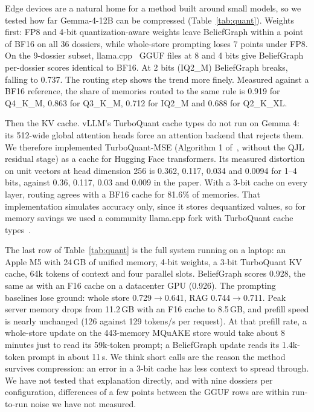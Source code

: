 \documentclass[conference]{IEEEtran}
\begin{document}
Edge devices are a natural home for a method built around small models, so we tested how far Gemma-4-12B can be compressed (Table~\ref{tab:quant}). Weights first: FP8 and 4-bit quantization-aware weights leave BeliefGraph within a point of BF16 on all 36 dossiers, while whole-store prompting loses 7 points under FP8. On the 9-dossier subset, llama.cpp~\cite{llamacpp} GGUF files at 8 and 4 bits give BeliefGraph per-dossier scores identical to BF16. At 2 bits (IQ2\_M) BeliefGraph breaks, falling to 0.737. The routing step shows the trend more finely. Measured against a BF16 reference, the share of memories routed to the same rule is 0.919 for Q4\_K\_M, 0.863 for Q3\_K\_M, 0.712 for IQ2\_M and 0.688 for Q2\_K\_XL.

Then the KV cache. vLLM's TurboQuant cache types do not run on Gemma 4: its 512-wide global attention heads force an attention backend that rejects them. We therefore implemented TurboQuant-MSE (Algorithm 1 of~\cite{zandieh2026turboquant}, without the QJL residual stage) as a cache for Hugging Face transformers. Its measured distortion on unit vectors at head dimension 256 is 0.362, 0.117, 0.034 and 0.0094 for 1--4 bits, against 0.36, 0.117, 0.03 and 0.009 in the paper. With a 3-bit cache on every layer, routing agrees with a BF16 cache for 81.6\% of memories. That implementation simulates accuracy only, since it stores dequantized values, so for memory savings we used a community llama.cpp fork with TurboQuant cache types~\cite{tqfork}.

The last row of Table~\ref{tab:quant} is the full system running on a laptop: an Apple M5 with 24\,GB of unified memory, 4-bit weights, a 3-bit TurboQuant KV cache, 64k tokens of context and four parallel slots. BeliefGraph scores 0.928, the same as with an F16 cache on a datacenter GPU (0.926). The prompting baselines lose ground: whole store 0.729$\to$0.641, RAG 0.744$\to$0.711. Peak server memory drops from 11.2\,GB with an F16 cache to 8.5\,GB, and prefill speed is nearly unchanged (126 against 129 tokens/s per request). At that prefill rate, a whole-store update on the 443-memory MQuAKE store would take about 8 minutes just to read its 59k-token prompt; a BeliefGraph update reads its 1.4k-token prompt in about 11\,s. We think short calls are the reason the method survives compression: an error in a 3-bit cache has less context to spread through. We have not tested that explanation directly, and with nine dossiers per configuration, differences of a few points between the GGUF rows are within run-to-run noise we have not measured.
\end{document}
